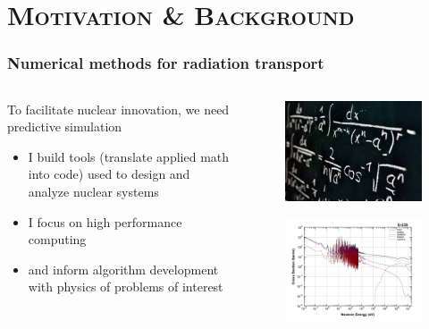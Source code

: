 \documentclass[xcolor=x11names,compress]{beamer}
\renewcommand{\(}{\begin{columns}}
\renewcommand{\)}{\end{columns}}
\newcommand{\<}[1]{\begin{column}{#1}}
\renewcommand{\>}{\end{column}}
\begin{document}
\section{\scshape Motivation \& Background}
\begin{frame}[fragile]
  \frametitle{Numerical methods for radiation transport}

\begin{columns}
  \begin{column}{0.55\textwidth}
  To facilitate nuclear innovation, 
we need predictive simulation
	\begin{itemize}
	\item I build tools (translate applied math into code) used to design and analyze nuclear systems
	\item I focus on high performance computing
	\item and inform algorithm development with physics of problems of interest
	\end{itemize}
  \end{column}
  \begin{column}{0.45\textwidth}
  	\begin{figure}
  	\begin{center}
  		\includegraphics[height=1.in,clip]{../figs/applied-math}\\
		\includegraphics[height=1.5in,clip]{../figs/u235-xsecs}
	\end{center}
  	\end{figure}
  \end{column}
\end{columns}

\end{frame}
\end{document}
